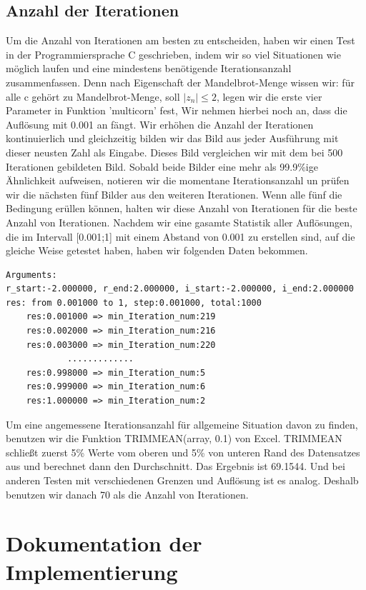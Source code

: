 \documentclass[course=erap]{aspdoc}
\begin{document}
\subsection{Anzahl der Iterationen}\label{Anzahl_der_Iterationen}
Um die Anzahl von Iterationen am besten zu entscheiden, haben wir einen Test in der Programmiersprache C geschrieben, indem wir so viel Situationen wie möglich laufen und eine mindestens benötigende Iterationsanzahl zusammenfassen. Denn nach Eigenschaft der Mandelbrot-Menge wissen wir: für alle c gehört zu Mandelbrot-Menge, soll $|z_n| \leq 2$, legen wir die erste vier Parameter in Funktion 'multicorn' fest, Wir nehmen hierbei noch an, dass die Auflösung mit 0.001 an fängt. Wir erhöhen die Anzahl der Iterationen kontinuierlich und gleichzeitig bilden wir das Bild aus jeder Ausführung mit dieser neusten Zahl als Eingabe. Dieses Bild vergleichen wir mit dem bei 500 Iterationen gebildeten Bild. Sobald beide Bilder eine mehr als 99.9\%ige Ähnlichkeit aufweisen, notieren wir die momentane Iterationsanzahl un prüfen wir die nächsten fünf Bilder aus den weiteren Iterationen. Wenn alle fünf die Bedingung erüllen können, halten wir diese Anzahl von Iterationen für die beste Anzahl von Iterationen. Nachdem wir eine gasamte Statistik aller Auflösungen, die im Intervall [0.001;1] mit einem Abstand von 0.001 zu erstellen sind, auf die gleiche Weise getestet haben, haben wir folgenden Daten bekommen.
\begin{lstlisting}
Arguments:
r_start:-2.000000, r_end:2.000000, i_start:-2.000000, i_end:2.000000
res: from 0.001000 to 1, step:0.001000, total:1000
	res:0.001000 => min_Iteration_num:219
	res:0.002000 => min_Iteration_num:216
	res:0.003000 => min_Iteration_num:220
            .............
	res:0.998000 => min_Iteration_num:5
	res:0.999000 => min_Iteration_num:6
	res:1.000000 => min_Iteration_num:2
\end{lstlisting}
Um eine angemessene Iterationsanzahl für allgemeine Situation davon zu finden, benutzen wir die Funktion TRIMMEAN(array, 0.1) von Excel. TRIMMEAN schließt zuerst 5\% Werte vom oberen und 5\% von unteren Rand des Datensatzes aus und berechnet dann den Durchschnitt. Das Ergebnis ist 69.1544. Und bei anderen Testen mit verschiedenen Grenzen und Auflösung ist es analog. Deshalb benutzen wir danach 70 als die Anzahl von Iterationen.
\section{Dokumentation der Implementierung}
\end{document}
